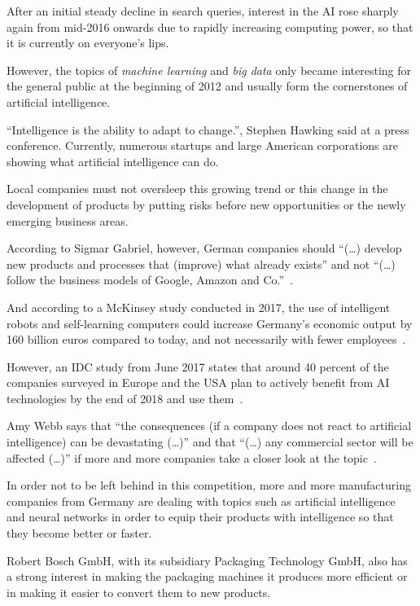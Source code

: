 After an initial steady decline in search queries, interest in the AI rose sharply again from mid-2016 onwards due to
rapidly increasing computing power, so that it is currently on everyone's lips.

However, the topics of \textit{machine learning} and \textit{big data} only became interesting for the general public
at the beginning of 2012 and usually form the cornerstones of artificial intelligence.

``Intelligence is the ability to adapt to change.'', Stephen Hawking said at a press conference. Currently,
numerous startups and large American corporations are showing what artificial intelligence can do.

Local companies must not oversleep this growing trend or this change in the development of products by putting risks
before new opportunities or the newly emerging business areas.

According to Sigmar Gabriel, however, German companies should ``(\ldots) develop new products and processes that
(improve) what already exists'' and not ``(\ldots) follow the business models of Google, Amazon and
Co.''~\cite{article_einleitung_ww_sg}.

And according to a McKinsey study conducted in 2017, the use of intelligent robots and self-learning computers could
increase Germany's economic output by 160 billion euros compared to today, and not necessarily with fewer
employees~\cite{online_einleitung_mckinsey}.

However, an IDC study from June 2017 states that around 40 percent of the companies surveyed in Europe and the USA plan
to actively benefit from AI technologies by the end of 2018 and use them~\cite{article_grundlagen_salesforce}.

Amy Webb says that ``the consequences (if a company does not react to artificial intelligence) can be devastating
(\ldots)'' and that ``(\ldots) any commercial sector will be affected (\ldots)'' if more and more companies take a
closer look at the topic~\cite{article_einleitung_dub_aw}.

In order not to be left behind in this competition, more and more manufacturing companies from Germany are dealing with
topics such as artificial intelligence and neural networks in order to equip their products with intelligence so that
they become better or faster.

Robert Bosch GmbH, with its subsidiary Packaging Technology GmbH, also has a strong interest in making the packaging
machines it produces more efficient or in making it easier to convert them to new products.

